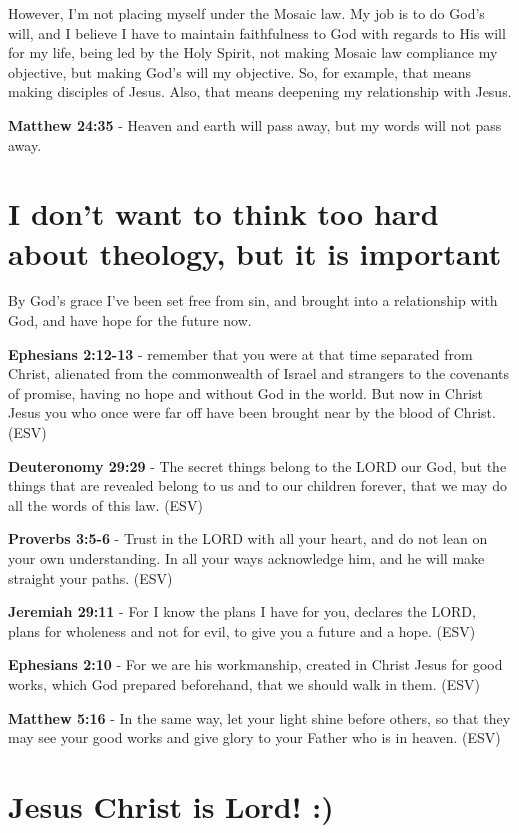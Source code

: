 \documentclass[11pt]{article}
\begin{document}
However, I'm not placing myself under the Mosaic law.
My job is to do God's will, and I believe I have to maintain faithfulness to God with regards to His will for my life,
being led by the Holy Spirit, not making Mosaic law compliance my objective, but making God's will my objective.
So, for example, that means making disciples of Jesus.
Also, that means deepening my relationship with Jesus.

\textbf{Matthew 24:35} - Heaven and earth will pass away, but my words will not pass away.

\section{I don't want to think too hard about theology, but it is important}
\label{sec:org45ab4eb}
By God's grace I've been set free from sin, and brought into a relationship with God, and have hope for the future now.

\textbf{Ephesians 2:12-13} -  remember that you were at that time separated from Christ, alienated from the commonwealth of Israel and strangers to the covenants of promise, having no hope and without God in the world.  But now in Christ Jesus you who once were far off have been brought near by the blood of Christ.  (ESV)

\textbf{Deuteronomy 29:29} -  The secret things belong to the LORD our God, but the things that are revealed belong to us and to our children forever, that we may do all the words of this law.  (ESV)

\textbf{Proverbs 3:5-6} - Trust in the LORD with all your heart, and do not lean on your own understanding. In all your ways acknowledge him, and he will make straight your paths. (ESV)

\textbf{Jeremiah 29:11} -  For I know the plans I have for you, declares the LORD, plans for wholeness and not for evil, to give you a future and a hope.  (ESV)

\textbf{Ephesians 2:10} - For we are his workmanship, created in Christ Jesus for good works, which God prepared beforehand, that we should walk in them. (ESV)

\textbf{Matthew 5:16} - In the same way, let your light shine before others, so that they may see your good works and give glory to your Father who is in heaven. (ESV)

\section{Jesus Christ is Lord! :)}
\label{sec:orgbe38534}
\end{document}
